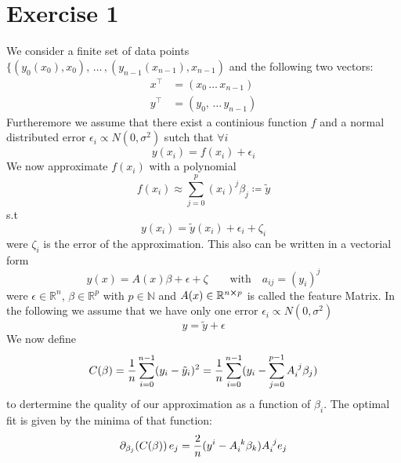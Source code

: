 \documentclass[12pt]{scrartcl}
\begin{document}
 \section{Exercise 1}
  We consider a finite set of data points $\{(y_0(x_0),x_0), \, \ldots \,, (y_{n-1}(x_{n-1}),x_{n-1})$
  and the following two vectors:
  \begin{align*}
  	x^\top &= (x_0 \, \ldots \, x_{n-1})	\\
  	y^\top &= (y_0, \, \ldots \, y_{n-1})
  \end{align*}
  Furtheremore we assume that there exist a continious function $f$ and a normal distributed error $\epsilon_i \propto N(0,\sigma^2)$ sutch that $\forall i$
  \begin{equation}
  	y(x_i) = f(x_i) + \epsilon_i
  \end{equation}
  We now approximate $f(x_i)$ with a polynomial
  \begin{equation}
  	f(x_i) \approx \sum_{j=0}^{p} (x_i)^j \beta_j \coloneqq \tilde{y}
  \end{equation}
  s.t
  \begin{equation}
  	y(x_i) = \tilde{y}(x_i) + \epsilon_i + \zeta_i
  \end{equation}
  were $\zeta_i$ is the error of the approximation.
  This also can be written in a vectorial form 
  \begin{equation}
  	y(x)=A(x)\beta+\epsilon+\zeta \quad \quad \text{with} \quad a_{ij}=(y_i)^j
  \end{equation}
  were $\epsilon \in \mathbb{R}^n$, $\beta \in \mathbb{R}^p$ with $p \in \mathbb{N}$ and $A(x) \in \mathbb{R}^{n\cross p}$ is called the feature Matrix.
  In the following we assume that we have only one error $\epsilon_i \propto N(0,\sigma^2)$\\
  \begin{equation}
  	y = \tilde{y} + \epsilon
  \end{equation}
  We now define
  \begin{equation}
  	C(\beta)=\frac{1}{n}\sum_{i=0}^{n-1}(y_i-\tilde{y}_i)^2 
  	= \frac{1}{n}\sum_{i=0}^{n-1}(y_i-\sum_{j=0}^{p-1}\tensor{A}{_i^j}\beta_j)
  \end{equation}
  to dertermine the quality of our approximation as a function of $\beta_i$.
  The optimal fit is given by the minima of that function:
  \begin{equation}
  	\partial_{\beta_{j}} (C(\beta)) \, e_j = \frac{2}{n}(y^i-\tensor{A}{_i^k} \beta_k)\tensor{A}{_i^j} e_j
  \end{equation}
\end{document}
